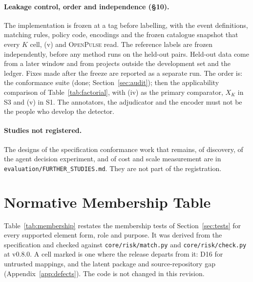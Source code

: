\documentclass[11pt,a4paper]{article}
\newcommand{\op}{\textsc{OpenPulse}}
\newcommand{\code}[1]{\texttt{#1}}
\newcommand{\release}{v0.8.0}
\begin{document}
\paragraph{Leakage control, order and independence (\S10).} The
implementation is frozen at a tag before labelling, with the event
definitions, matching rules, policy code, encodings and the frozen
catalogue snapshot that every $K$ cell, (v) and \op{} read. The
reference labels are frozen independently, before any method runs on
the held-out pairs. Held-out data come from a later window and from
projects outside the development set and the ledger. Fixes made after
the freeze are reported as a separate run. The order is: the
conformance suite (done; Section~\ref{sec:audit}); then the
applicability comparison of Table~\ref{tab:factorial}, with (iv) as
the primary comparator, $X_K$ in S3 and (v) in S1. The annotators, the
adjudicator and the encoder must not be the people who develop the
detector.

\paragraph{Studies not registered.} The designs of the specification
conformance work that remains, of discovery, of the agent decision
experiment, and of cost and scale measurement are in
\code{evaluation/FURTHER\_STUDIES.md}. They are not part of the
registration.

\section{Normative Membership Table}
\label{app:membership}
Table~\ref{tab:membership} restates the membership tests of
Section~\ref{sec:tests} for every supported element form, role and
purpose. It was derived from the specification and checked against
\code{core/risk/match.py} and \code{core/risk/check.py} at
\release{}. A cell marked \ddag{} is one where the release departs
from it: D16 for untrusted mappings, and the latent package and
source-repository gap (Appendix~\ref{app:defects}). The code is not
changed in this revision.
\end{document}
